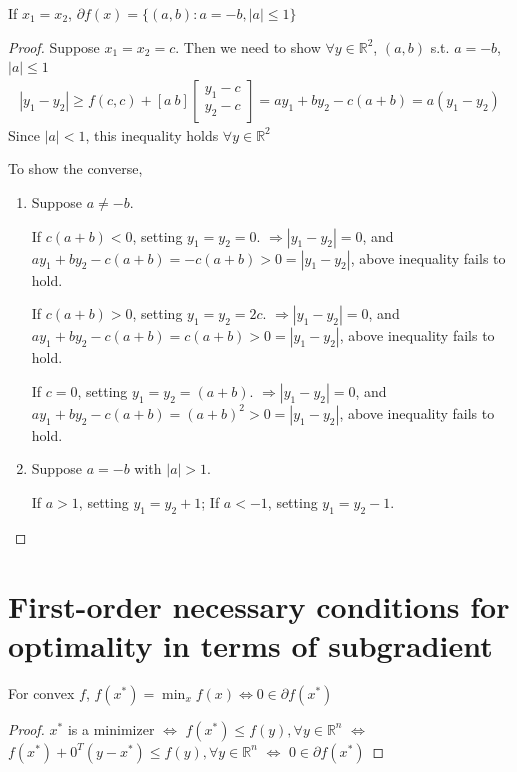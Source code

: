 \documentclass[11pt]{elegantbook}
\begin{document}
\begin{proposition}
    If $x_1=x_2$, $\partial f(x)=\{(a,b):a=-b,|a|\leq 1\}$
\end{proposition}
\begin{proof}
    Suppose $x_1=x_2=c$. Then we need to show $\forall y\in \mathbb{R}^2$, $(a,b)$ s.t. $a=-b$, $|a|\leq 1$
    \begin{equation}
        \begin{aligned}
            |y_1-y_2|\geq f(c,c)+[a\ b]\begin{bmatrix}
                y_1-c\\
                y_2-c
            \end{bmatrix}=ay_1+by_2-c(a+b)=a(y_1-y_2)
        \end{aligned}
        \nonumber
    \end{equation}
    Since $|a|<1$, this inequality holds $\forall y\in \mathbb{R}^2$
    
    To show the converse,
    \begin{enumerate}
        \item Suppose $a\neq -b$.
        
        If $c(a+b)<0$, setting $y_1=y_2=0$. $\Rightarrow |y_1-y_2|=0$, and $ay_1+by_2-c(a+b)=-c(a+b)>0=|y_1-y_2|$, above inequality fails to hold.

        If $c(a+b)>0$, setting $y_1=y_2=2c$. $\Rightarrow |y_1-y_2|=0$, and $ay_1+by_2-c(a+b)=c(a+b)>0=|y_1-y_2|$, above inequality fails to hold.

        If $c=0$, setting $y_1=y_2=(a+b)$. $\Rightarrow |y_1-y_2|=0$, and $ay_1+by_2-c(a+b)=(a+b)^2>0=|y_1-y_2|$, above inequality fails to hold.
        \item Suppose $a=-b$ with $|a|>1$.
        
        If $a>1$, setting $y_1=y_2+1$; If $a<-1$, setting $y_1=y_2-1$.

    \end{enumerate}
\end{proof}

\section{First-order necessary conditions for optimality in terms of subgradient}
\begin{proposition}
    For convex $f$, $f(x^*)=\min_x f(x)\Leftrightarrow 0\in \partial f(x^*)$
\end{proposition}
\begin{proof}
    $x^*$ is a minimizer $\Leftrightarrow$ $f(x^*)\leq f(y),\forall y\in \mathbb{R}^n$ $\Leftrightarrow$ $f(x^*)+0^T(y-x^*)\leq f(y),\forall y\in \mathbb{R}^n$ $\Leftrightarrow$ $0\in \partial f(x^*)$
\end{proof}
\end{document}
